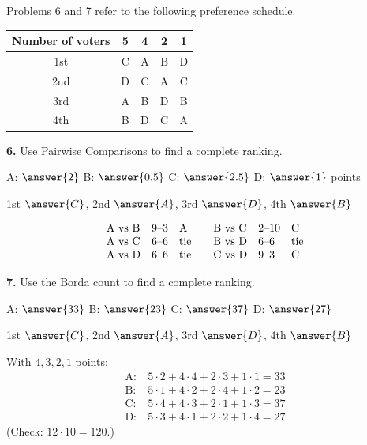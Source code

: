 \documentclass[12pt]{ximera}
\begin{document}
\begin{problem}
Problems 6 and 7 refer to the following preference schedule.
\begin{center}
\begin{tabular}{c|cccc}
Number of voters & 5 & 4 & 2 & 1\\\hline
1st & C & A & B & D\\
2nd & D & C & A & C\\
3rd & A & B & D & B\\
4th & B & D & C & A
\end{tabular}
\end{center}

\begin{prompt}
\textbf{6.} Use Pairwise Comparisons to find a complete ranking.

A: $\answer{2}$ \quad B: $\answer{0.5}$ \quad C: $\answer{2.5}$ \quad D: $\answer{1}$
points

\smallskip
1st $\answer{C}$, 2nd $\answer{A}$, 3rd $\answer{D}$, 4th $\answer{B}$

\begin{feedback}
\[
\begin{array}{lll@{\qquad}lll}
\text{A vs B} & 9\text{--}3 & \text{A} & \text{B vs C} & 2\text{--}10 & \text{C}\\
\text{A vs C} & 6\text{--}6 & \text{tie} & \text{B vs D} & 6\text{--}6 & \text{tie}\\
\text{A vs D} & 6\text{--}6 & \text{tie} & \text{C vs D} & 9\text{--}3 & \text{C}
\end{array}
\]
\end{feedback}
\end{prompt}

\begin{prompt}
\textbf{7.} Use the Borda count to find a complete ranking.

A: $\answer{33}$ \quad B: $\answer{23}$ \quad C: $\answer{37}$ \quad D: $\answer{27}$

\smallskip
1st $\answer{C}$, 2nd $\answer{A}$, 3rd $\answer{D}$, 4th $\answer{B}$

\begin{feedback}
With $4,3,2,1$ points:
\[
\begin{aligned}
\text{A:}&\ 5\cdot2+4\cdot4+2\cdot3+1\cdot1=33\\
\text{B:}&\ 5\cdot1+4\cdot2+2\cdot4+1\cdot2=23\\
\text{C:}&\ 5\cdot4+4\cdot3+2\cdot1+1\cdot3=37\\
\text{D:}&\ 5\cdot3+4\cdot1+2\cdot2+1\cdot4=27
\end{aligned}
\]
(Check: $12\cdot10=120$.)
\end{feedback}
\end{prompt}
\end{problem}
\end{document}
